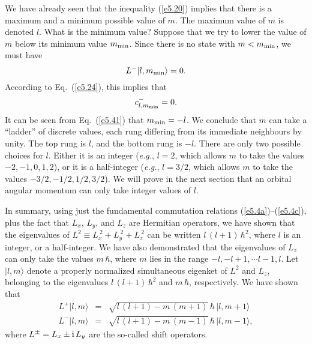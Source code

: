 We have already seen that the inequality (\ref{e5.20}) implies that there is a
maximum and a minimum possible value of $m$. The maximum value of $m$
is denoted $l$. What is the minimum value? Suppose that we try
to lower the value of $m$ below its minimum value $m_{\rm min}$. Since
there is no state with $m<m_{\rm min}$, we must have
\begin{equation}
L^- |l, m_{\rm min}\rangle = 0.
\end{equation}
According to Eq.~(\ref{e5.24}), this implies that
\begin{equation}
c_{l,  m_{\rm min}}^- = 0.
\end{equation}
It can be seen from Eq.~(\ref{e5.41})  that $m_{\rm min} = -l$. 
We conclude that $m$ can take a ``ladder'' of discrete values, each rung differing
from its immediate neighbours by unity. The top rung is $l$, and the
bottom rung is  $-l$. There are only two possible choices for $l$.
Either it is an integer ({\em e.g.}, $l=2$, which  allows $m$ to take the values
$-2, -1, 0, 1, 2$), or it is a half-integer ({\em e.g.}, $l=3/2$, which  allows
$m$ to take the values $-3/2, -1/2, 1/2, 3/2$). We will prove in the next
section that an orbital angular momentum can only take integer values
of $l$. 

In summary, using  just  the fundamental commutation relations (\ref{e5.4a})--(\ref{e5.4c}),
plus the fact that $L_x$, $L_y$, and $L_z$ are Hermitian operators, we have
shown that the eigenvalues of $L^2\equiv L_x^{~2} + L_y^{~2}+L_z^{~2}$
can be written $l\,(l+1)\,\hbar^2$, where $l$ is an integer, or a half-integer. 
We have also demonstrated that the eigenvalues of $L_z$ can only
take the values $m\,\hbar$, where $m$ lies in the range $-l, -l+1,\cdots
l-1, l$. Let $|l, m\rangle$ denote a properly normalized simultaneous eigenket
of $L^2$ and $L_z$, belonging to the eigenvalues $l\,(l+1)\,\hbar^2$
and $m\,\hbar$, respectively.
We have shown that 
\begin{eqnarray}\label{e5.44a}
L^+ |l, m\rangle &=& \sqrt{l\,(l+1)-m\,(m+1)}\,\hbar\,|l, m+1\rangle\\[0.5ex]
L^- |l,m \rangle &=& \sqrt{l\,(l+1)-m\,(m-1)}\,\hbar\,|l, m-1\rangle,\label{e5.44b}
\end{eqnarray}
where $L^\pm = L_x \pm {\rm i} \,L_y$ are the so-called shift operators.

